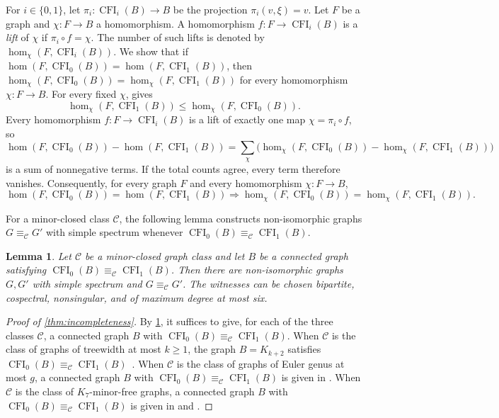\documentclass[11pt,a4paper]{article}
\theoremstyle{plain}
\newtheorem{lemma}[theorem]{Lemma}
\theoremstyle{definition}
\DeclareMathOperator{\CFI}{CFI}
\begin{document}
For $i\in\{0,1\}$, let $\pi_i:\CFI_i(B)\to B$ be the projection
$\pi_i(v,\xi)=v$.
Let $F$ be a graph and $\chi:F\to B$ a homomorphism.
A homomorphism $f:F\to\CFI_i(B)$ is a \emph{lift} of $\chi$ if
$\pi_i\circ f=\chi$.
The number of such lifts is denoted by $\hom_\chi(F,\CFI_i(B))$.
We show that if $\hom(F,\CFI_0(B))=\hom(F,\CFI_1(B))$, then
$\hom_\chi(F,\CFI_0(B))=\hom_\chi(F,\CFI_1(B))$ for every homomorphism
$\chi:F\to B$.
For every fixed $\chi$, \cite[Theorem~3.6]{Roberson2026} gives
\begin{equation}\label{eq:ss-coloured-monotonicity}
  \hom_\chi(F,\CFI_1(B))\leq\hom_\chi(F,\CFI_0(B)).
\end{equation}
Every homomorphism $f:F\to\CFI_i(B)$ is a lift of exactly one map
$\chi=\pi_i\circ f$, so
\begin{equation}\label{eq:ss-lift-differences}
 \hom(F,\CFI_0(B))-\hom(F,\CFI_1(B))
 =\sum_\chi\bigl(\hom_\chi(F,\CFI_0(B))-\hom_\chi(F,\CFI_1(B))\bigr)
\end{equation}
is a sum of nonnegative terms. If the total counts agree, every term
therefore vanishes.
Consequently, for every graph $F$ and every homomorphism
$\chi:F\to B$,
\begin{equation}\label{eq:ss-lift-equality}
 \hom(F,\CFI_0(B))=\hom(F,\CFI_1(B))
 \Longrightarrow
 \hom_\chi(F,\CFI_0(B))=\hom_\chi(F,\CFI_1(B)).
\end{equation}

For a minor-closed class $\mathcal C$, the following lemma constructs
non-isomorphic graphs $G\equiv_{\mathcal C}G'$ with simple spectrum
whenever $\CFI_0(B)\equiv_{\mathcal C}\CFI_1(B)$.

\begin{lemma}\label{lem:ss-transfer}
Let $\mathcal C$ be a minor-closed graph class and let $B$ be a connected
graph satisfying $\CFI_0(B)\equiv_{\mathcal C}\CFI_1(B)$. Then there are non-isomorphic
graphs $G,G'$ with simple spectrum and $G\equiv_{\mathcal C}G'$.
The witnesses can be chosen bipartite, cospectral, nonsingular, and of
maximum degree at most six.
\end{lemma}

\begin{proof}[Proof of \cref{thm:incompleteness}]
By \cref{lem:ss-transfer}, it suffices to give, for each of the three
classes $\mathcal C$, a connected graph $B$ with
$\CFI_0(B)\equiv_{\mathcal C}\CFI_1(B)$.
When $\mathcal C$ is the class of graphs of treewidth at most $k\geq1$, the graph
$B=K_{k+2}$ satisfies
$\CFI_0(B)\equiv_{\mathcal C}\CFI_1(B)$~\cite[Theorem~10 and Lemma~12]{Neuen2024}.
When $\mathcal C$ is the class of graphs of Euler genus at most $g$, a connected
graph $B$ with $\CFI_0(B)\equiv_{\mathcal C}\CFI_1(B)$ is given in
\cite[Lemma~2.10 and proof of Theorem~1.8]{NeuenSeppelt2026}.
When $\mathcal C$ is the class of $K_7$-minor-free graphs, a connected graph $B$ with
$\CFI_0(B)\equiv_{\mathcal C}\CFI_1(B)$ is given in
\cite[Lemma~2.10 and proof of Theorem~1.9]{NeuenSeppelt2026}
and \cite[Theorem~1.7 and Section~1.3]{ThilikosWiederrecht2024}.
\end{proof}
\end{document}
